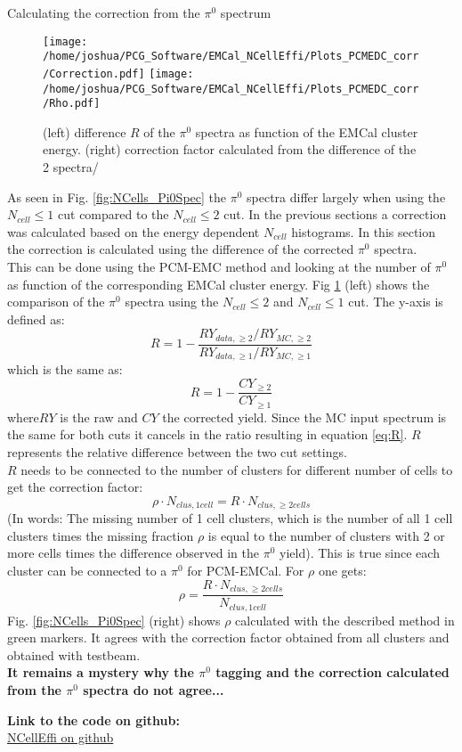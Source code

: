 \documentclass[ALICE]{ALICE_analysis_notes}
\newcommand{\PZ}{$\pi^0$\xspace}
\begin{document}
\begin{section}{Calculating the correction from the \PZ spectrum}
	\begin{figure}[h!]
		\centering
		\texttt{[image: /home/joshua/PCG\_Software/EMCal\_NCellEffi/Plots\_PCMEDC\_corr/Correction.pdf]}
		\texttt{[image: /home/joshua/PCG\_Software/EMCal\_NCellEffi/Plots\_PCMEDC\_corr/Rho.pdf]}
		\caption{ (left) difference $R$ of the \PZ spectra as function of the EMCal cluster energy. (right) correction factor calculated from the difference of the 2 spectra/}
		\label{fig:NCellEff_from spectrum}
		
	\end{figure}
	
	As seen in Fig. \ref{fig:NCells_Pi0Spec} the \PZ spectra differ largely when using the $N_{cell} \leq 1$ cut compared to the $N_{cell} \leq 2$ cut. In the previous sections a correction was calculated based on the energy dependent $N_{cell}$ histograms. In this section the correction is calculated using the difference of the corrected \PZ spectra. \\
	This can be done using the PCM-EMC method and looking at the number of \PZ as function of the corresponding EMCal cluster energy. Fig \ref{fig:NCellEff_from spectrum} (left) shows the comparison of the \PZ spectra using the $N_{cell} \leq 2$ and $N_{cell} \leq 1$ cut. The y-axis is defined as:
	\begin{equation}
		R = 1 - \frac{RY_{data, \geq 2} / RY_{MC, \geq 2}}{RY_{data, \geq 1} / RY_{MC, \geq 1}}
		\label{eq:R}
	\end{equation}
	which is the same as:
	\begin{equation}
	R = 1 - \frac{CY_{\geq2}}{CY_{\geq1}}
	\end{equation}
	where$RY$ is the raw and $CY$ the corrected yield. Since the MC input spectrum is the same for both cuts it cancels in the ratio resulting in equation \ref{eq:R}. $R$ represents the relative difference between the two cut settings.\\
	$R$ needs to be connected to the number of clusters for different number of cells to get the correction factor:
	\begin{equation}
	\rho \cdot N_{clus, 1 cell}= R \cdot N_{clus, \geq 2 cells}
	\end{equation}
	(In words: The missing number of 1 cell clusters, which is the number of all 1 cell clusters times the missing fraction $\rho$ is equal to the number of clusters with 2 or more cells times the difference observed in the \PZ yield). This is true since each cluster can be connected to a \PZ for PCM-EMCal. For $\rho$ one gets:
	\begin{equation}
	\rho = \frac{R \cdot N_{clus, \geq 2 cells}}{N_{clus, 1 cell}}
	\end{equation}
	Fig. \ref{fig:NCells_Pi0Spec} (right) shows $\rho$ calculated with the described method in green markers. It agrees with the correction factor obtained from all clusters and obtained with testbeam. \\
	\textbf{It remains a mystery why the \PZ tagging and the correction calculated from the \PZ spectra do not agree...}
	
	
\end{section}
\clearpage
\centering
\textbf{Link to the code on github:}\\
\href{https://github.com/jokonig/EMCal_NCellEffi}{NCellEffi on github}


\clearpage
\end{document}
